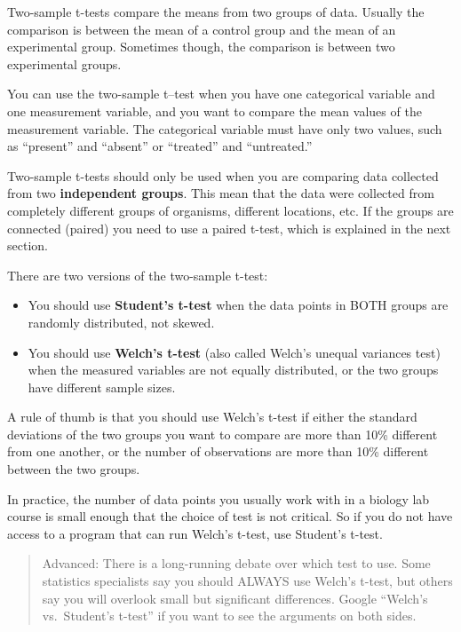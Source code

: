 \documentclass[
]{book}
\providecommand{\tightlist}{%
  \setlength{\itemsep}{0pt}\setlength{\parskip}{0pt}}
\begin{document}
Two-sample t-tests compare the means from two groups of data. Usually the comparison is between the mean of a control group and the mean of an experimental group. Sometimes though, the comparison is between two experimental groups.

You can use the two-sample t--test when you have one categorical variable and one measurement variable, and you want to compare the mean values of the measurement variable. The categorical variable must have only two values, such as ``present'' and ``absent'' or ``treated'' and ``untreated.''

Two-sample t-tests should only be used when you are comparing data collected from two \textbf{independent groups}. This mean that the data were collected from completely different groups of organisms, different locations, etc. If the groups are connected (paired) you need to use a paired t-test, which is explained in the next section.

There are two versions of the two-sample t-test:

\begin{itemize}
\tightlist
\item
  You should use \textbf{Student's t-test} when the data points in BOTH groups are randomly distributed, not skewed.
\item
  You should use \textbf{Welch's t-test} (also called Welch's unequal variances test) when the measured variables are not equally distributed, or the two groups have different sample sizes.
\end{itemize}

A rule of thumb is that you should use Welch's t-test if either the standard deviations of the two groups you want to compare are more than 10\% different from one another, or the number of observations are more than 10\% different between the two groups.

In practice, the number of data points you usually work with in a biology lab course is small enough that the choice of test is not critical. So if you do not have access to a program that can run Welch's t-test, use Student's t-test.

\begin{quote}
Advanced: There is a long-running debate over which test to use. Some statistics specialists say you should ALWAYS use Welch's t-test, but others say you will overlook small but significant differences. Google ``Welch's vs.~Student's t-test'' if you want to see the arguments on both sides.
\end{quote}
\end{document}
